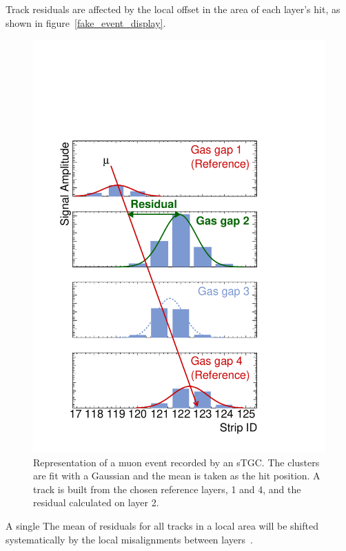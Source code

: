 Track residuals are affected by the local offset in the area of each layer's hit, as shown in figure~\ref{fake_event_display}. 

\begin{figure}
    \centering
    \includegraphics[width = \textwidth]{figures/figure_fake_event_display.pdf}
    \caption{Representation of a muon event recorded by an sTGC. The clusters are fit with a Gaussian and the mean is taken as the hit position. A track is built from the chosen reference layers, 1 and 4, and the residual calculated on layer 2.}
    \label{fig:fake_event_display}
\end{figure}

A single The mean of residuals for all tracks in a local area will be shifted systematically by the local misalignments between layers~\cite{lefebvre_thesis}. 

